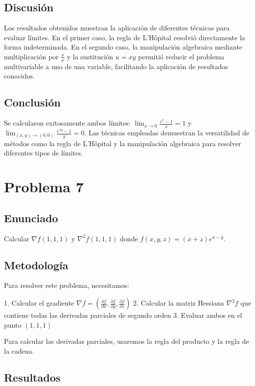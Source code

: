 \documentclass{article}
\begin{document}
\subsection{Discusión}
Los resultados obtenidos muestran la aplicación de diferentes técnicas para evaluar límites. En el primer caso, la regla de L'Hôpital resolvió directamente la forma indeterminada. En el segundo caso, la manipulación algebraica mediante multiplicación por $\frac{x}{x}$ y la sustitución $u = xy$ permitió reducir el problema multivariable a uno de una variable, facilitando la aplicación de resultados conocidos.

\subsection{Conclusión}
Se calcularon exitosamente ambos límites: $\lim_{x \to 0} \frac{e^x - 1}{x} = 1$ y $\lim_{(x,y) \to (0,0)} \frac{e^{xy} - 1}{y} = 0$. Las técnicas empleadas demuestran la versatilidad de métodos como la regla de L'Hôpital y la manipulación algebraica para resolver diferentes tipos de límites.

\section{Problema 7}

\subsection{Enunciado}
Calcular $\nabla f(1, 1, 1)$ y $\nabla^2 f(1, 1, 1)$ donde $f(x, y, z) = (x + z)e^{x-y}$.

\subsection{Metodología}

Para resolver este problema, necesitamos:

1. Calcular el gradiente $\nabla f = \left(\frac{\partial f}{\partial x}, \frac{\partial f}{\partial y}, \frac{\partial f}{\partial z}\right)$
2. Calcular la matriz Hessiana $\nabla^2 f$ que contiene todas las derivadas parciales de segundo orden
3. Evaluar ambos en el punto $(1, 1, 1)$

Para calcular las derivadas parciales, usaremos la regla del producto y la regla de la cadena.

\subsection{Resultados}
\setcounter{equation}{0}
\end{document}
